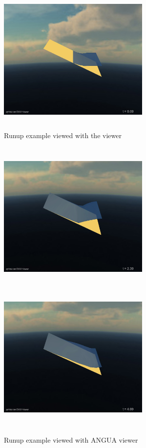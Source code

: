 \documentclass{manual}
\begin{document}
\begin{figure}[htp]
  \centerline{\includegraphics[width=75mm, height=75mm]
    {graphics/bedslopestart.jpg}}
  \caption{Runup example viewed with the \anuga viewer}
  \label{fig:runupstart}
\end{figure}

\begin{figure}[htp]
  \centerline{
    \includegraphics[width=75mm, height=75mm]{graphics/bedslopeduring.jpg}
    \includegraphics[width=75mm, height=75mm]{graphics/bedslopeend.jpg}
   }
  \caption{Runup example viewed with ANGUA viewer}
  \label{fig:runup2}
\end{figure}
\end{document}
